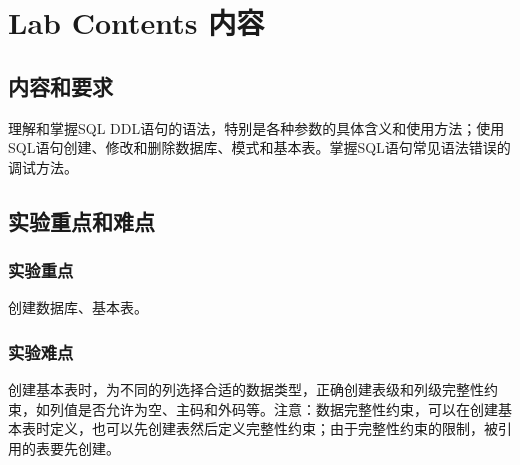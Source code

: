\section{Lab Contents 内容}
\subsection{内容和要求}
理解和掌握SQL DDL语句的语法，特别是各种参数的具体含义和使用方法；使用SQL语句创建、修改和删除数据库、模式和基本表。掌握SQL语句常见语法错误的调试方法。
\subsection{实验重点和难点}
\subsubsection{实验重点}
创建数据库、基本表。
\subsubsection{实验难点}
创建基本表时，为不同的列选择合适的数据类型，正确创建表级和列级完整性约束，如列值是否允许为空、主码和外码等。注意：数据完整性约束，可以在创建基本表时定义，也可以先创建表然后定义完整性约束；由于完整性约束的限制，被引用的表要先创建。